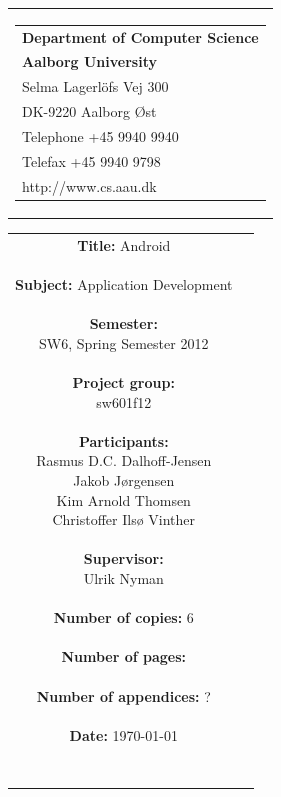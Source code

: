 \begin{nopagebreak}
\samepage 
\begin{tabular}{r}
\parbox{\textwidth}{
\hfill \parbox{6.2cm}{\begin{tabular}{l}
{\textsf\small \textbf{Department of Computer Science }}\\
{\textsf\small  \textbf{Aalborg University}}\\
{\textsf\small Selma Lagerlöfs Vej 300}\\
{\textsf\small DK-9220 Aalborg Øst}\\
{\textsf\small Telephone +45 9940 9940}\\
{\textsf\small Telefax +45 9940 9798}\\
{\textsf\small http://www.cs.aau.dk}
\end{tabular}}}
\end{tabular}

\begin{tabular}{cc}
\parbox{7cm}{
\textbf{Title:} 
Android\\ \\
\textbf{Subject:} 
Application Development \\ \\
\textbf{Semester:} \\
SW6, Spring Semester 2012\\ \\
\textbf{Project group:} \\
sw601f12\\ \\
\textbf{Participants:} \\
Rasmus D.C. Dalhoff-Jensen \\
Jakob J\o{}rgensen \\
Kim Arnold Thomsen \\
Christoffer Ils\o{} Vinther\\ \\
\textbf{Supervisor:} \\
Ulrik Nyman\\ \\
\textbf{Number of copies:}
6 \\ \\
\textbf{Number of pages:}
 \\ \\
\textbf{Number of appendices:}
? \\ \\
\textbf{Date:}
\today \\ \\ \\
}


\end{tabular}
\end{nopagebreak}
